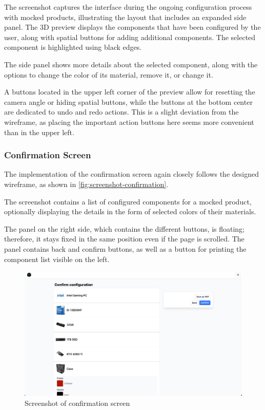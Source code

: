 The screenshot captures the interface during the ongoing configuration process with mocked products, illustrating the layout that includes an expanded side panel. The 3D preview displays the components that have been configured by the user, along with spatial buttons for adding additional components. The selected component is highlighted using black edges.

The side panel shows more details about the selected component, along with the options to change the color of its material, remove it, or change it.

A buttons located in the upper left corner of the preview allow for resetting the camera angle or hiding spatial buttons, while the buttons at the bottom center are dedicated to undo and redo actions. This is a slight deviation from the wireframe, as placing the important action buttons here seems more convenient than in the upper left.


\subsubsection{Confirmation Screen}

The implementation of the confirmation screen again closely follows the designed wireframe, as shown in \autoref{fig:screenshot-confirmation}.

The screenshot contains a list of configured components for a mocked product, optionally displaying the details in the form of selected colors of their materials.

The panel on the right side, which contains the different buttons, is floating; therefore, it stays fixed in the same position even if the page is scrolled. The panel contains back and confirm buttons, as well as a button for printing the component list visible on the left.

\begin{figure}[h]
\centering
\includegraphics[width=\textwidth]{images/screenshot_confirmation.png}
\caption{Screenshot of confirmation screen}
\label{fig:screenshot-confirmation}
\end{figure}


